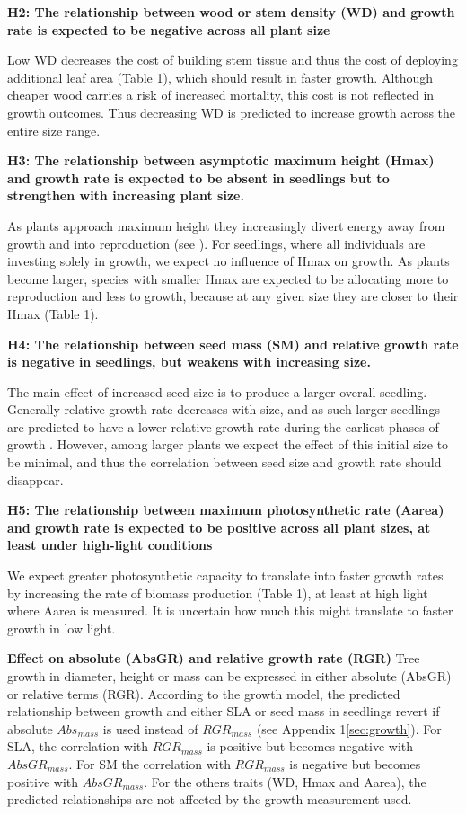 \documentclass[a4paper]{article}\usepackage[]{graphicx}\usepackage[]{color}
\begin{document}
\textbf{H2: The relationship between wood or stem density (WD) and growth rate is expected to be negative across all plant size}

Low WD decreases the cost of building stem tissue and thus the cost of deploying additional leaf area (Table 1), which should result in faster growth. Although cheaper wood carries a risk of increased mortality, this cost is not reflected in growth outcomes. Thus decreasing WD is predicted to increase growth across the entire size range. 

\textbf{H3: The relationship between asymptotic maximum height (Hmax) and growth rate is expected to be absent in seedlings but to strengthen with increasing plant size.}

As plants approach maximum height they increasingly divert energy away from growth and into reproduction (see \citealt{Thomas:1996do, Falster:2011ii, Wenk:2014jz}). For seedlings, where all individuals are investing solely in growth, we expect no influence of Hmax on growth. As plants become larger, species with smaller Hmax are expected to be allocating more to reproduction and less to growth, because at any given size they are closer to their Hmax (Table 1). 

\textbf{H4: The relationship between seed mass (SM) and relative growth rate is negative in seedlings, but weakens with increasing size.}

The main effect of increased seed size is to produce a larger overall seedling. Generally relative growth rate decreases with size, and as such larger seedlings are predicted to have a lower relative growth rate during the earliest phases of growth \citet{Turnbull:2012ew}. However, among larger plants we expect the effect of this initial size to be minimal, and thus the correlation between seed size and growth rate should disappear.

\textbf{H5: The relationship between maximum photosynthetic rate (Aarea) and growth rate is expected to be positive across all plant sizes, at least under high-light conditions}

We expect greater photosynthetic capacity to translate into faster growth rates by increasing the rate of biomass production (Table 1), at least at high light where Aarea is measured. It is uncertain how much this might translate to faster growth in low light.

\textbf{Effect on absolute (AbsGR) and relative growth rate (RGR)}  
Tree growth in diameter, height or mass can be expressed in either absolute (AbsGR) or relative terms (RGR). According to the growth model, the predicted relationship between growth and either SLA or seed mass in seedlings revert if absolute $Abs_{mass}$ is used instead of $RGR_{mass}$ (see Appendix 1\ref{sec:growth}). For SLA, the correlation with $RGR_{mass}$ is positive but becomes negative with $AbsGR_{mass}$. For SM the correlation with $RGR_{mass}$ is negative but becomes positive with $AbsGR_{mass}$. For the others traits (WD, Hmax and Aarea), the predicted relationships are not affected by the growth measurement used. 
\end{document}
